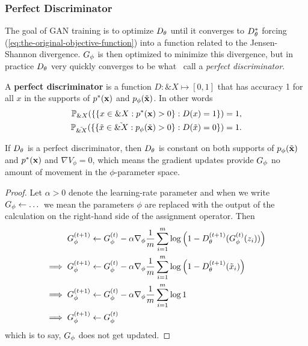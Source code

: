 
\subsubsection*{Perfect Discriminator}

The goal of GAN training is to optimize $D_\theta$ until it converges to
$D_\theta^*$ forcing (\ref{eq:the-original-objective-function}) into a
function related to the Jensen-Shannon divergence.  $G_\phi$ is then
optimized to minimize this divergence, but in practice $D_\theta$ very
quickly converges to be what~\cite{ref:arjovsky-towards-2017} call a
\textit{perfect discriminator}.

\begin{definition}%
  \label{def:perfect-discriminator}
  A \textbf{perfect discriminator} is a function $D:
  \&X \mapsto [0,1]$ that has accuracy 1 for all $x$ in the supports
  of $p^*(\mathbf{x})$ and $p_{\phi}(\tilde{\mathbf{x}})$. In other words
  \begin{align}
    \mathbb{P}_{\&X}(\{\{x \in \&X : p^*(\mathbf{x}) > 0\} : D(x) = 1 \} )= 1, \\
    \mathbb{P}_{\tilde{\&X}}(\{\{\tilde{x} \in \tilde{\&X} : p_{\phi}(\tilde{\mathbf{x}}) > 0\} : D(\tilde{x}) = 0 \} )= 1.
  \end{align}
\end{definition}

\begin{theorem}%
  \label{thm:perfect-discriminator}
  If $D_\theta$ is a perfect discriminator, then $D_\theta$ is constant on both
  supports of $p_{\phi}(\tilde{\mathbf{x}})$ and $p^*(\mathbf{x})$ and $\nabla{V_\phi} = 0$, which means
  the gradient updates provide $G_\phi$ no amount of movement in the
  $\phi$-parameter space.
\end{theorem}

\begin{proof}%
  \label{prf:perfect-discriminator}
  Let $\alpha > 0$ denote the learning-rate parameter and when we
  write $G_\phi \gets \dots$ we mean the parameters $\phi$ are replaced
  with the output of the calculation on the right-hand side of the
  assignment operator. Then
  \begin{align}
    \label{eq:g-updates-no-good}
    G_\phi^{(t+1)} & \gets G_\phi^{(t)} - \alpha\nabla_\phi {1 \over m} \sum_{i=1}^m \log\left( 1 - D_\theta^{(t+1)}(G_\phi^{(t)}(z_i)) \right) \\
    \implies G_\phi^{(t+1)} & \gets G_\phi^{(t)} - \alpha\nabla_\phi {1 \over m} \sum_{i=1}^m \log{ \left( 1 - D_\theta^{(t+1)}(\tilde{x}_i) \right)} \\
    \implies G_\phi^{(t+1)} & \gets G_\phi^{(t)} - \alpha\nabla_\phi {1 \over m} \sum_{i=1}^m \log{1} \\
    \implies G_\phi^{(t+1)} & \gets G_\phi^{(t)}
  \end{align} which is to say, $G_\phi$ does not get updated.
\end{proof}

